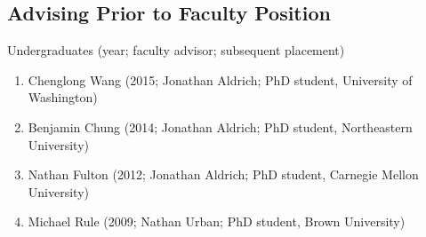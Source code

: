 \documentclass[10pt,letterpaper]{article}
\renewenvironment{itemize}{
  \begin{list}{}{
    \setlength{\leftmargin}{1.25em}
    \setlength{\itemsep}{0.25em}
    \setlength{\parskip}{0pt}
    \setlength{\parsep}{0.2em}
  }
}{
  \end{list}
}
\begin{document}
\subsection*{Advising Prior to Faculty Position}

\begin{itemize}
  \item Undergraduates (year; faculty advisor; subsequent placement)
        \begin{enumerate}
          \item Chenglong Wang (2015; Jonathan Aldrich; PhD student, University of Washington)
          \item Benjamin Chung (2014; Jonathan Aldrich; PhD student, Northeastern University)
          \item Nathan Fulton (2012; Jonathan Aldrich; PhD student, Carnegie Mellon University)
          \item Michael Rule (2009; Nathan Urban; PhD student, Brown University)
        \end{enumerate}
\end{itemize}
\end{document}
